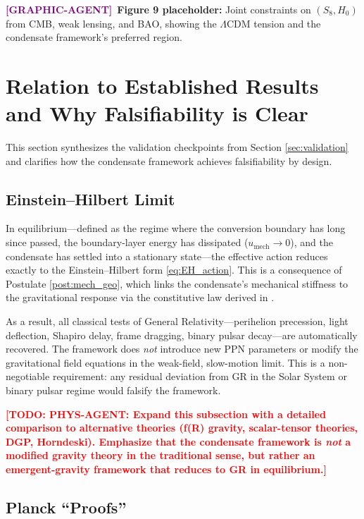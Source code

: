 \documentclass[11pt,a4paper]{article}
\newcommand{\umech}{u_{\mathrm{mech}}}
\theoremstyle{definition}
\newcommand{\TODO}[1]{\textcolor{red}{\textbf{[TODO: #1]}}}
\newcommand{\GRAPHAGENT}{\textcolor{purple}{\textbf{[GRAPHIC-AGENT]}}}
\begin{document}
\GRAPHAGENT~\textbf{Figure 9 placeholder:} Joint constraints on $(S_8, H_0)$ from CMB, weak lensing, and BAO, showing the $\Lambda$CDM tension and the condensate framework's preferred region.

\section{Relation to Established Results and Why Falsifiability is Clear}
\label{sec:relation}

This section synthesizes the validation checkpoints from Section \ref{sec:validation} and clarifies how the condensate framework achieves falsifiability by design.

\subsection{Einstein--Hilbert Limit}
\label{sec:EH_limit}

In equilibrium---defined as the regime where the conversion boundary has long since passed, the boundary-layer energy has dissipated ($\umech \to 0$), and the condensate has settled into a stationary state---the effective action reduces exactly to the Einstein--Hilbert form \eqref{eq:EH_action}. This is a consequence of Postulate \ref{post:mech_geo}, which links the condensate's mechanical stiffness to the gravitational response via the constitutive law derived in \cite{SkavbergMechG2025,SkavbergMechGR2025}.

As a result, all classical tests of General Relativity---perihelion precession, light deflection, Shapiro delay, frame dragging, binary pulsar decay---are automatically recovered. The framework does \emph{not} introduce new PPN parameters or modify the gravitational field equations in the weak-field, slow-motion limit. This is a non-negotiable requirement: any residual deviation from GR in the Solar System or binary pulsar regime would falsify the framework.

\TODO{PHYS-AGENT: Expand this subsection with a detailed comparison to alternative theories (f(R) gravity, scalar-tensor theories, DGP, Horndeski). Emphasize that the condensate framework is \emph{not} a modified gravity theory in the traditional sense, but rather an emergent-gravity framework that reduces to GR in equilibrium.}

\subsection{Planck ``Proofs''}
\label{sec:Planck_proofs}
\end{document}
